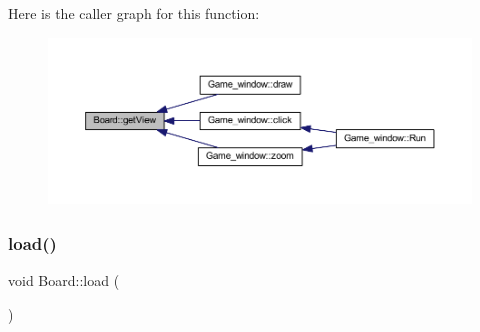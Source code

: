 Here is the caller graph for this function\+:\nopagebreak
\begin{figure}[H]
\begin{center}
\leavevmode
\includegraphics[width=350pt]{class_board_ad3c413e185668418d3a16c1fec68e70d_icgraph}
\end{center}
\end{figure}
\mbox{\label{class_board_a841a248dac4743611ba1825afd5d1297}} 
\subsubsection{\texorpdfstring{load()}{load()}\hspace{0.1cm}{\footnotesize\ttfamily [1/2]}}
{\footnotesize\ttfamily void Board\+::load (\begin{DoxyParamCaption}{ }\end{DoxyParamCaption})}

